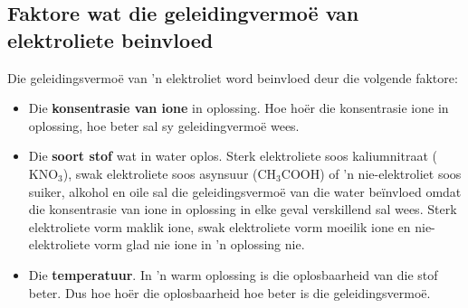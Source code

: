             \subsection*{Faktore wat die geleidingvermoë van elektroliete beinvloed}
            \nopagebreak
Die geleidingsvermoë van  'n elektroliet word beinvloed deur die volgende faktore:
        \label{m38720*id339291}\begin{itemize}[noitemsep]
\label{m38720*uid58}\item Die \textbf{konsentrasie van ione} in oplossing. Hoe ho\"{e}r die konsentrasie ione in oplossing, hoe beter sal sy geleidingvermo\"{e} wees.
\label{m38720*uid57}\item Die \textbf{soort stof} wat in water oplos. Sterk elektroliete soos kaliumnitraat (${\text{KNO}}_{3}$), swak elektroliete soos asynsuur (${\text{CH}}_{3}\text{COOH}$) of  'n nie-elektroliet soos suiker, alkohol en oile sal die geleidingsvermoë van die water beïnvloed omdat die konsentrasie van ione in oplossing in elke geval verskillend sal wees. Sterk elektroliete vorm maklik ione, swak elektroliete vorm moeilik ione en nie-elektroliete vorm glad nie ione in  'n oplossing nie.


\label{m38720*uid59}\item Die \textbf{temperatuur}. In  'n warm oplossing is die oplosbaarheid van die stof beter.  Dus hoe ho\"{e}r die oplosbaarheid hoe beter is die geleidingsvermo\"{e}.
\end{itemize} \nopagebreak
\label{m38720*secfhsst!!!underscore!!!id739}
